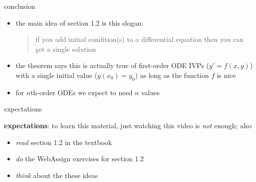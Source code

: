 \documentclass{beamer}
\begin{document}
\begin{frame}{conclusion}

\begin{itemize}
\item the main idea of section 1.2 is this slogan:

\bigskip

\begin{quote}
\alert{if you add initial condition(s) to a differential equation then you can get a single solution}
\end{quote}

\bigskip

\item the theorem says this is actually true of first-order ODE IVPs ($y'=f(x,y)$) with a single initial value ($y(x_0)=y_0$) as long as the function $f$ is nice
\item for $n$th-order ODEs we expect to need $n$ values
\end{itemize}
\end{frame}


\begin{frame}{expectations}

\textbf{expectations}:  to learn this material, just watching this video is \emph{not} enough; also
\begin{itemize}
\item \emph{read} section 1.2 in the textbook
\item \emph{do} the WebAssign exercises for section 1.2
\item \emph{think} about the these ideas
\end{itemize}
\end{frame}
\end{document}
